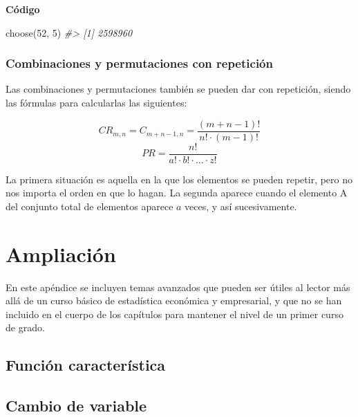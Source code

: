 \documentclass[
]{book}
\newenvironment{Shaded}{\begin{snugshade}}{\end{snugshade}}
\newcommand{\CommentTok}[1]{\textcolor[rgb]{0.56,0.35,0.01}{\textit{#1}}}
\newcommand{\DecValTok}[1]{\textcolor[rgb]{0.00,0.00,0.81}{#1}}
\newcommand{\FunctionTok}[1]{\textcolor[rgb]{0.00,0.00,0.00}{#1}}
\newcommand{\NormalTok}[1]{#1}
\begin{document}
\textbf{Código}

\begin{Shaded}
\begin{Highlighting}[]
\FunctionTok{choose}\NormalTok{(}\DecValTok{52}\NormalTok{, }\DecValTok{5}\NormalTok{)}
\CommentTok{\#\textgreater{} [1] 2598960}
\end{Highlighting}
\end{Shaded}

\hypertarget{combinaciones-y-permutaciones-con-repeticiuxf3n}{%
\subsection{Combinaciones y permutaciones con repetición}\label{combinaciones-y-permutaciones-con-repeticiuxf3n}}

Las combinaciones y
permutaciones también se pueden dar con repetición, siendo las fórmulas
para calcularlas las siguientes:

\[\mathit{CR}_{m,n}= \mathit{C}_{m+n-1,n}= \frac{(m+n-1)!}{n!\cdot(m-1)!}\]
\[\mathit{PR} = \frac{n!}{a!\cdot b!\cdot \ldots\cdot z!}\]

La primera situación es aquella en la que los
elementos se pueden repetir, pero no nos importa el orden en que lo
hagan. La segunda aparece cuando el elemento A del conjunto total de
elementos aparece \(a\) veces, y así sucesivamente.

\hypertarget{ampliaciuxf3n}{%
\chapter{Ampliación}\label{ampliaciuxf3n}}

En este apéndice se incluyen temas avanzados que pueden ser útiles al lector
más allá de un curso básico de estadística económica y empresarial, y
que no se han incluido en el cuerpo de los capítulos para mantener el nivel
de un primer curso de grado.

\hypertarget{funciuxf3n-caracteruxedstica}{%
\section{Función característica}\label{funciuxf3n-caracteruxedstica}}

\hypertarget{cambio-de-variable}{%
\section{Cambio de variable}\label{cambio-de-variable}}
\end{document}
